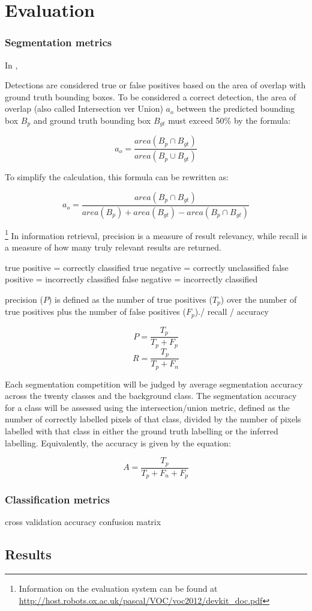 \chapter{Evaluation}
\subsection{Segmentation metrics}

In \cite{pascalVoc2012},

Detections are considered true or false positives based on the area of overlap with ground truth bounding boxes. To be considered a correct detection, the area of overlap (also called Intersection ver Union) $a_o$ between the predicted bounding box $B_p$ and ground truth bounding box $B_{gt}$ must exceed 50\% by the formula:

$$a_o = \frac{area(B_p \cap B_{gt})}{area(B_p \cup B_{gt})} $$

To simplify the calculation, this formula can be rewritten as:

$$a_o = \frac{area(B_p \cap B_{gt})}{area(B_p) + area(B_{gt}) - area(B_p \cap B_{gt})} $$

\footnote{Information on the evaluation system can be found at  \url{http://host.robots.ox.ac.uk/pascal/VOC/voc2012/devkit_doc.pdf}}
In information retrieval, precision is a measure of result relevancy, while recall is a measure of how many truly relevant results are returned.

true positive = correctly classified
true negative = correctly unclassified
false positive = incorrectly classified
false negative = incorrectly classified

precision ($P$)  is defined as the number of true positives ($T_p$) over the number of true positives plus the number of false positives ($F_p$)./ recall / accuracy

$$ P =  \frac{T_p}{T_p + F_p}$$
$$ R =  \frac{T_p}{T_p + F_n}$$

Each segmentation competition will be judged by average segmentation accuracy across the twenty classes and the background class. The segmentation accuracy for a class will be assessed using the intersection/union metric, defined as the number of correctly labelled pixels of that class, divided by the number of pixels labelled with that class in either the ground truth labelling or the inferred labelling. Equivalently, the accuracy is given by the equation:

$$ A = \frac{T_p}{T_p + F_n + F_p} $$

\subsection{Classification metrics}

cross validation
accuracy
confusion matrix

\section{Results}